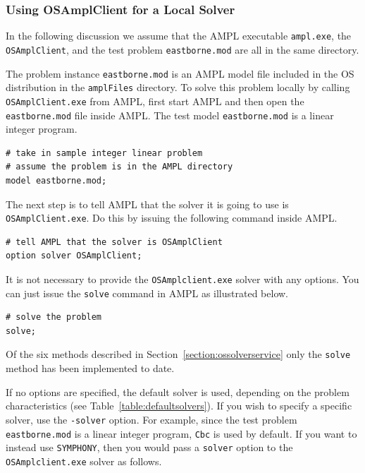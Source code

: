 \documentclass[11pt]{article}
\renewcommand{\_}{{\char"5F}}
\renewcommand{\{}{{\char"7B}}
\renewcommand{\}}{{\char"7D}}
\renewcommand{\^}{{\char"0D}}
\renewcommand{\'}{{\char"0D}}
\begin{document}
\begin{enumerate}[Step 1:]
\subsubsection{Using OSAmplClient for a Local Solver}\label{section:localampl}

In the following discussion we assume that the AMPL executable {\tt ampl.exe}, the {\tt OSAmplClient},  
and the test problem {\tt  eastborne.mod}
 are all in the same directory.  

The  problem instance {\tt eastborne.mod} is an AMPL model file included in the OS distribution 
in the {\tt amplFiles} directory.  To solve this problem locally 
by calling {\tt OSAmplClient.exe} from AMPL, first start AMPL and then open the {\tt eastborne.mod} file 
inside AMPL.  The test model {\tt eastborne.mod} is a linear integer program. 

\begin{verbatim}
# take in sample integer linear problem
# assume the problem is in the AMPL directory
model eastborne.mod;
\end{verbatim}

The next step is to tell AMPL that the solver it is going to use is {\tt OSAmplClient.exe}. 
Do this by issuing the following command inside AMPL.

\begin{verbatim}
# tell AMPL that the solver is OSAmplClient
option solver OSAmplClient;
\end{verbatim}

It is not necessary to provide the  {\tt OSAmplclient.exe} solver with any options. 
You can just issue the {\tt solve} command in AMPL as illustrated below.  

\begin{verbatim}
# solve the problem
solve;
\end{verbatim}

Of the six methods described in Section~\ref{section:ossolverservice} only the {\tt solve} method 
has been implemented to date.

If no options are specified, the default solver is used, depending on the problem characteristics 
(see Table~\ref{table:defaultsolvers}).
If you wish to specify a specific solver, use the {\tt -solver} option.   For example,  
since the test problem {\tt eastborne.mod} is a linear integer program, {\tt Cbc} is used by default. 
If you want to instead use {\tt SYMPHONY},
then you would pass a {\tt solver} option to the {\tt OSAmplclient.exe} solver as follows.%


\end{enumerate}
\end{document}
